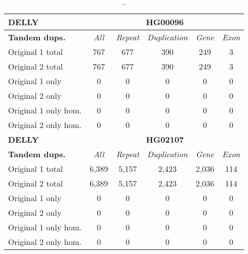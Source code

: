 \begin{table}[htb]
\caption{ .. }
\begin{center}
\begin{tabular}{|l|c||c|c|c|c|}
\hline
{\bf DELLY} & \multicolumn{5}{|c|}{\bf HG00096} \\
\hline
\cline{2-6}
{\bf Tandem dups.} & {\it All} & {\it Repeat} & {\it Duplication} & {\it Gene} & {\it Exon} \\
\hline
Original 1 total & 767 & 677 & 390 & 249 & 3\\ 
\hline
Original 2 total & 767 & 677 & 390 & 249 & 3\\ 
\hline
Original 1 only & 0 & 0 & 0 & 0 & 0\\ 
\hline
Original 2 only & 0 & 0 & 0 & 0 & 0\\ 
\hline
Original 1 only hom. & 0 & 0 & 0 & 0 & 0\\ 
\hline
Original 2 only hom. & 0 & 0 & 0 & 0 & 0\\ 
\hline
\hline
{\bf DELLY} & \multicolumn{5}{|c|}{\bf HG02107} \\
\hline
\cline{2-6}
{\bf Tandem dups.} & {\it All} & {\it Repeat} & {\it Duplication} & {\it Gene} & {\it Exon} \\
\hline
Original 1 total & 6,389 & 5,157 & 2,423 & 2,036 & 114\\ 
\hline
Original 2 total & 6,389 & 5,157 & 2,423 & 2,036 & 114\\ 
\hline
Original 1 only & 0 & 0 & 0 & 0 & 0\\ 
\hline
Original 2 only & 0 & 0 & 0 & 0 & 0\\ 
\hline
Original 1 only hom. & 0 & 0 & 0 & 0 & 0\\ 
\hline
Original 2 only hom. & 0 & 0 & 0 & 0 & 0\\ 
\hline
\end{tabular}
\end{center}
\label{tab:orig-vs-orig2-delly-dups}
\end{table}

